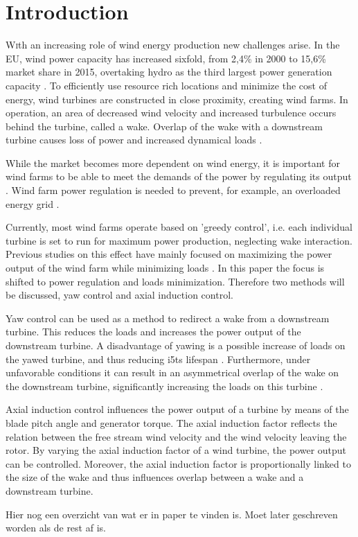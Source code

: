 \section{Introduction}
\lettrine[nindent=0em,lines=3]
With an increasing role of wind energy production new challenges arise\cite{Nat2016}. In the EU, wind power capacity has increased sixfold, from 2,4\% in 2000 to 15,6\% market share in 2015, overtaking hydro as the third largest power generation capacity \cite{EWEA2015}. To efficiently use resource rich locations and minimize the cost of energy, wind turbines are constructed in close proximity, creating wind farms. In operation, an area of decreased wind velocity and increased turbulence occurs behind the turbine, called a wake. Overlap of the wake with a downstream turbine causes loss of power and increased dynamical loads \cite{Boersma2017, Wilson2017, Dijk2016, Fleming2014, Zalkind2016}. 

While the market becomes more dependent on wind energy, it is important for wind farms to be able to meet the demands of the power by regulating its output \cite{Tande2003}. Wind farm power regulation is needed to prevent, for example, an overloaded energy grid \cite{Hansen2014}. 

Currently, most wind farms operate based on 'greedy control', i.e. each individual turbine is set to run for maximum power production, neglecting wake interaction. Previous studies on this effect have mainly focused on maximizing the power output of the wind farm while minimizing loads \cite{Dijk2016, vanDijk2016, Wilson2017}. In this paper the focus is shifted to power regulation and loads minimization. Therefore two methods will be discussed, yaw control and axial induction control. 

Yaw control can be used as a method to redirect a wake from a downstream turbine. This reduces the loads and increases the power output of the downstream turbine. A disadvantage of yawing is a possible increase of loads on the yawed turbine, and thus reducing i5ts lifespan \cite{Zalkind2016,Kanev2017}. Furthermore, under unfavorable conditions it can result in an asymmetrical overlap of the wake on the downstream turbine, significantly increasing the loads on this turbine \cite{Wilson2017,Dijk2016}. 

Axial induction control influences the power output of a turbine by means of the blade pitch angle and generator torque. The axial induction factor reflects the relation between the free stream wind velocity and the wind velocity leaving the rotor. By varying the axial induction factor of a wind turbine, the power output can be controlled. Moreover, the axial induction factor is proportionally linked to the size of the wake and thus influences overlap between a wake and a downstream turbine.  

Hier nog een overzicht van wat er in paper te vinden is. Moet later geschreven worden als de rest af is.
